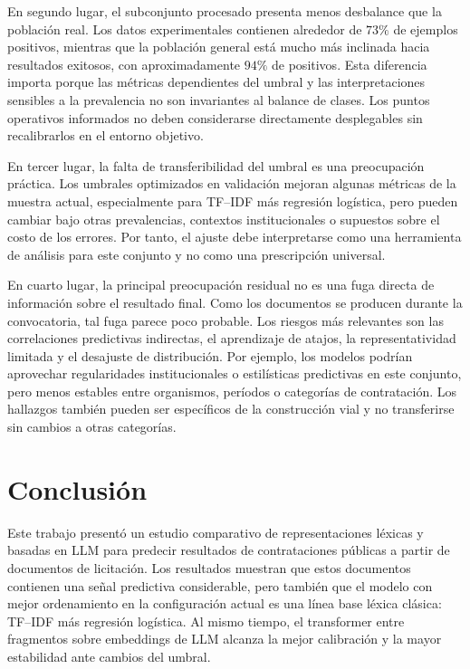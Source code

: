En segundo lugar, el subconjunto procesado presenta menos desbalance que la población real. Los datos experimentales contienen alrededor de $73\%$ de ejemplos positivos, mientras que la población general está mucho más inclinada hacia resultados exitosos, con aproximadamente $94\%$ de positivos. Esta diferencia importa porque las métricas dependientes del umbral y las interpretaciones sensibles a la prevalencia no son invariantes al balance de clases. Los puntos operativos informados no deben considerarse directamente desplegables sin recalibrarlos en el entorno objetivo.

En tercer lugar, la falta de transferibilidad del umbral es una preocupación práctica. Los umbrales optimizados en validación mejoran algunas métricas de la muestra actual, especialmente para TF--IDF más regresión logística, pero pueden cambiar bajo otras prevalencias, contextos institucionales o supuestos sobre el costo de los errores. Por tanto, el ajuste debe interpretarse como una herramienta de análisis para este conjunto y no como una prescripción universal.

En cuarto lugar, la principal preocupación residual no es una fuga directa de información sobre el resultado final. Como los documentos se producen durante la convocatoria, tal fuga parece poco probable. Los riesgos más relevantes son las correlaciones predictivas indirectas, el aprendizaje de atajos, la representatividad limitada y el desajuste de distribución. Por ejemplo, los modelos podrían aprovechar regularidades institucionales o estilísticas predictivas en este conjunto, pero menos estables entre organismos, períodos o categorías de contratación. Los hallazgos también pueden ser específicos de la construcción vial y no transferirse sin cambios a otras categorías.

\chapter{Conclusión}
Este trabajo presentó un estudio comparativo de representaciones léxicas y basadas en LLM para predecir resultados de contrataciones públicas a partir de documentos de licitación. Los resultados muestran que estos documentos contienen una señal predictiva considerable, pero también que el modelo con mejor ordenamiento en la configuración actual es una línea base léxica clásica: TF--IDF más regresión logística. Al mismo tiempo, el transformer entre fragmentos sobre embeddings de LLM alcanza la mejor calibración y la mayor estabilidad ante cambios del umbral.

